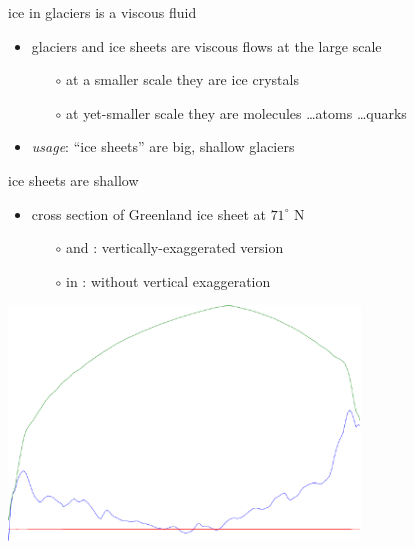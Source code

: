 \documentclass[hide notes,intlimits]{beamer}
\begin{document}
\begin{frame}{ice in glaciers is a viscous fluid}
\bigskip
\begin{itemize}
\item glaciers and ice sheets are viscous flows at the large scale
  \begin{itemize}
  \item[$\circ$] at a smaller scale they are ice crystals
  \item[$\circ$] at yet-smaller scale they are molecules \dots atoms \dots quarks
  \end{itemize}
\item \emph{usage}: ``ice sheets'' are big, shallow glaciers
\end{itemize}
\end{frame}


\begin{frame}{ice sheets are shallow}

\begin{itemize}
\item cross section of Greenland ice sheet at $71^\circ$ N
  \begin{itemize}
  \item[$\circ$] {\color{dark green}{green}} and {\color{dark blue}{blue}}: vertically-exaggerated version
  \item[$\circ$] in {\color{dark red}{red}}: without vertical exaggeration
  \end{itemize}
\end{itemize}
\normalsize

  \begin{center}
      \quad \includegraphics[width=0.7\textwidth]{greentransecttrimmed}
    
    \bigskip
    \qquad\qquad\qquad {}
  \end{center}
\end{frame}
\end{document}
